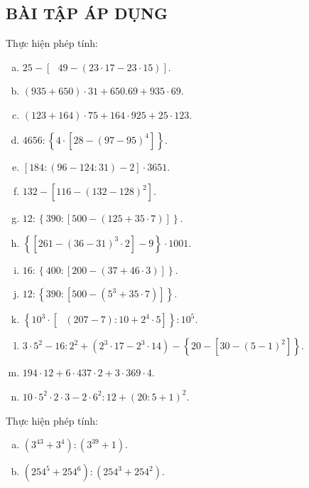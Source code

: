 \subsection{BÀI TẬP ÁP DỤNG}
\begin{bt}
Thực hiện phép tính:
\begin{enumerate}[a)]
\item $25-\left[ \text{ }49-\left( 23\cdot 17-23\cdot 15 \right) \right]$. 
\item $\left( 935+650 \right)\cdot 31+650.69+935\cdot 69$.
\item $\left( 123+164 \right)\cdot 75+164\cdot 925+25\cdot 123$.
\item $4656:\left\{ 4\cdot \left[ 28-{{\left( 97-95 \right)}^{4}} \right] \right\}$.
\item $\left[ 184:\left( 96-124:31 \right)-2 \right]\cdot 3651$.
\item $132-\left[ 116-{{\left( 132-128 \right)}^{2}} \right]$.
\item $12:\left\{ 390:\left[ 500-\left(125+35\cdot 7\right) \right] \right\}$. 
\item $\left\{ \left[ 261-{{\left( 36-31 \right)}^{3}}\cdot 2 \right]-9\right\}\cdot 1001$.
\item $16:\left\{ 400:\left[ 200-\left( 37+46\cdot 3 \right) \right] \right\}$.
\item $12:\left\{ 390:\left[ 500-\left( {{5}^{3}}+35\cdot 7 \right) \right] \right\}$.		
\item $\left\{ {{10}^{3}}\cdot \left[ \text{ }\left( 207-7 \right):{10}+{{2}^{4}}\cdot 5 \right] \right\}:{{10}^{5}}$.
\item $3\cdot {{5}^{2}}-16:{{2}^{2}}+\left( {{2}^{3}}\cdot 17-{{2}^{3}}\cdot 14 \right)-\left\{ 20-\left[ 30-{{\left( 5-1 \right)}^{2}} \right] \right\}$.
\item $194\cdot 12+6\cdot 437\cdot 2+3\cdot 369\cdot 4$.
\item $10\cdot {{5}^{2}}\cdot 2\cdot 3-2\cdot {{6}^{2}}:12+{{\left( 20:5+1 \right)}^{2}}$.
\end{enumerate}
\end{bt}   \begin{bt}
Thực hiện phép tính:
\begin{enumerate}[a)]
\item $\left( {{3}^{43}}+{{3}^{4}} \right):\left( {{3}^{39}}+1 \right)$.
\item $\left( {{254}^{5}}+{{254}^{6}} \right):\left( {{254}^{3}}+{{254}^{2}} \right)$.


\end{enumerate}
\end{bt}
